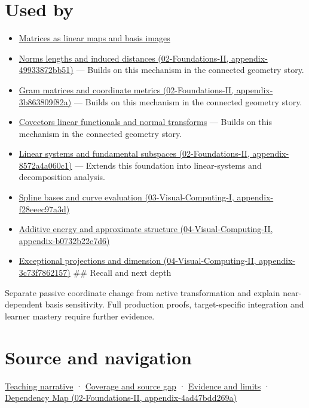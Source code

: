 \section{Used by}\label{appendix-ce0341f7ea0d-used-by}

\begin{itemize}
\item
  \hyperref[appendix-bd39c3bf5d64]{Matrices as linear maps and basis images}
\item
  \href{../02-Foundations-II/main.pdf\#nameddest=appendix-49933872bb51}{Norms lengths and induced distances (02-Foundations-II, appendix-49933872bb51)} --- Builds on this mechanism in the connected geometry story.
\item
  \href{../02-Foundations-II/main.pdf\#nameddest=appendix-3b863809f82a}{Gram matrices and coordinate metrics (02-Foundations-II, appendix-3b863809f82a)} --- Builds on this mechanism in the connected geometry story.
\item
  \hyperref[appendix-46da295c6787]{Covectors linear functionals and normal transforms} --- Builds on this mechanism in the connected geometry story.
\item
  \href{../02-Foundations-II/main.pdf\#nameddest=appendix-8572a4a060c1}{Linear systems and fundamental subspaces (02-Foundations-II, appendix-8572a4a060c1)} --- Extends this foundation into linear-systems and decomposition analysis.
\item
  \href{../03-Visual-Computing-I/main.pdf\#nameddest=appendix-f28eeec97a3d}{Spline bases and curve evaluation (03-Visual-Computing-I, appendix-f28eeec97a3d)}
\item
  \href{../04-Visual-Computing-II/main.pdf\#nameddest=appendix-b0732b22e7d6}{Additive energy and approximate structure (04-Visual-Computing-II, appendix-b0732b22e7d6)}
\item
  \href{../04-Visual-Computing-II/main.pdf\#nameddest=appendix-3c73f7862157}{Exceptional projections and dimension (04-Visual-Computing-II, appendix-3c73f7862157)} \#\# Recall and next depth
\end{itemize}

Separate passive coordinate change from active transformation and explain near-dependent basis sensitivity. Full production proofs, target-specific integration and learner mastery require further evidence.

\section{Source and navigation}\label{appendix-ce0341f7ea0d-source-and-navigation}

\href{Continuous\%20Notes/Computing\%20Foundations\%20-\%20From\%20Bits\%20to\%20C++\%20and\%20Systems\%20APIs\#A\%20basis\%20is\%20a\%20measuring\%20arrangement,\%20not\%20the\%20vector\%20itself}{Teaching narrative} · \hyperref[appendix-fd090d982a15-phase-6---parts-501-600]{Coverage and source gap} · \hyperref[appendix-a103e7846d21-phase-6---source-analysis-and-verification]{Evidence and limits} · \href{../02-Foundations-II/main.pdf\#nameddest=appendix-4ad47bdd269a}{Dependency Map (02-Foundations-II, appendix-4ad47bdd269a)}
